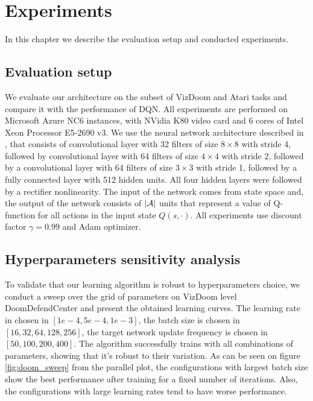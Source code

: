 \section{Experiments}

In this chapter we describe the evaluation setup and conducted experiments.


\subsection{Evaluation setup}

We evaluate our architecture on the subset of VizDoom and Atari tasks and compare it with the
performance of DQN. All experiments are performed on Microsoft Azure NC6 instances, with NVidia K80
video card and 6 cores of Intel Xeon Processor E5-2690 v3. We use the neural network architecture
described in \cite{mnih-dqn-2015}, that consists of convolutional layer with 32 filters of size $8
\times 8$ with stride 4, followed by convolutional layer with 64 filters of size $4 \times 4$ with
stride 2, followed by a convolutional layer with 64 filters of size $3 \times 3$ with stride 1,
followed by a fully connected layer with 512 hidden units. All four hidden layers were followed by
a rectifier nonlinearity. The input of the network comes from state space and,
the output of the network consists of $\left | \mathcal{A} \right |$ units that represent a value of Q-function
for all actions in the input state $Q(s, \cdot)$.
All experiments use discount factor $\gamma = 0.99$ and Adam optimizer.

\subsection{Hyperparameters sensitivity analysis}

To validate that our learning algorithm is robust to hyperparameters choice, we conduct a sweep
over the grid of parameters on VizDoom level DoomDefendCenter and present the obtained learning
curves. The learning rate in chosen in $[1e-4, 5e-4, 1e-3]$, the batch size is chosen in
$[16, 32, 64, 128, 256]$, the target network update frequency is chosen in $[50, 100, 200, 400]$.
The algorithm successfully trains with all combinations of parameters, showing that it's robust
to their variation.
As can be seen on figure \ref{fig:doom_sweep} from the parallel plot, the configurations with
largest batch size show the best performance after training for a fixed number of iterations.
Also, the configurations with large learning rates tend to have worse performance.

